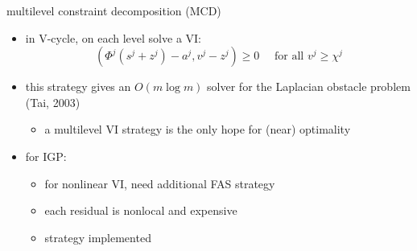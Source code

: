 \documentclass[usepdftitle=false,usenames,dvipsnames]{beamer}
\newcommand{\ip}[2]{\left(#1,#2\right)}
\begin{document}
\begin{frame}{multilevel constraint decomposition (MCD)}

\begin{itemize}
\item in V-cycle, on each level solve a VI:
    $$\ip{\Phi^j(s^j + z^j) - a^j}{v^j - z^j} \ge 0 \quad \text{ for all $v^j \ge \chi^j$}$$

\item this strategy gives an $O(m\log m)$ solver for the Laplacian obstacle problem (Tai, 2003)
    \begin{itemize}
    \item \alert{a multilevel VI strategy is the only hope for (near) optimality}
    \end{itemize}
\item for IGP:
    \begin{itemize}
    \item for nonlinear VI, need additional FAS strategy {\Large\strut} 
    \item each residual is nonlocal and expensive {\Large\strut} 
    \item<2> {\color{ForestGreen} strategy implemented}
    \end{itemize}
\end{itemize}
\end{frame}
\end{document}
